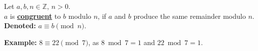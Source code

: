 \noindent
\begin{Def}[Congruence]

    \label{def:congruence}

    Let $a,b,n\in\mathbb{Z}$, $n>0$.\\

    \noindent
    $a$ is \underline{\textbf{congruent}} to $b$ modulo $n$, if $a$ and $b$ produce the same remainder
    modulo $n$.\\

    \noindent
    \textbf{Denoted:} $a\equiv b\pmod{n}$.
\end{Def}

\noindent
\textbf{Example:} $8\equiv22\pmod7$, as $8\bmod7=1$ and $22\bmod7=1$.\\






